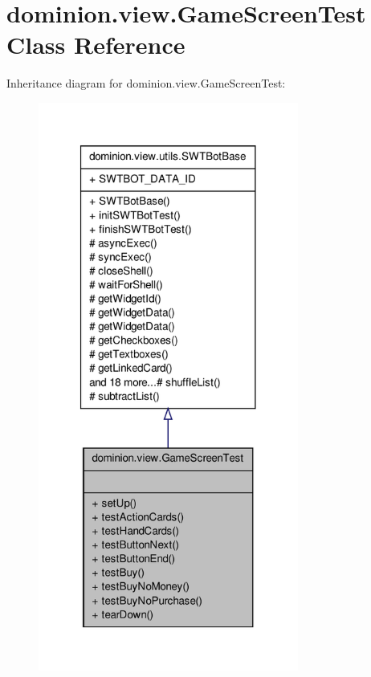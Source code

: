 \hypertarget{classdominion_1_1view_1_1GameScreenTest}{\section{dominion.\-view.\-Game\-Screen\-Test \-Class \-Reference}
\label{classdominion_1_1view_1_1GameScreenTest}
}


\-Inheritance diagram for dominion.\-view.\-Game\-Screen\-Test\-:
\nopagebreak
\begin{figure}[H]
\begin{center}
\leavevmode
\includegraphics[width=242pt]{classdominion_1_1view_1_1GameScreenTest__inherit__graph}
\end{center}
\end{figure}


